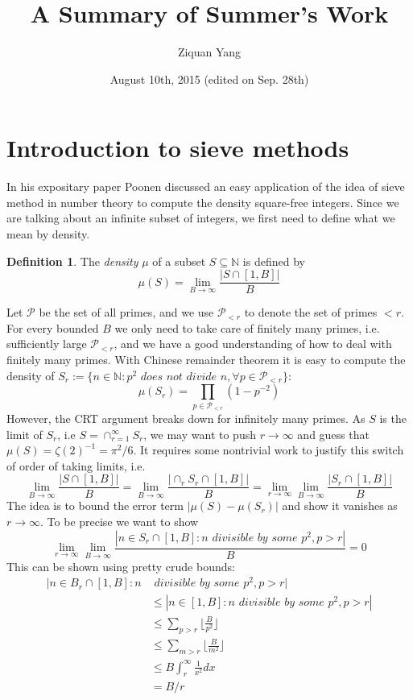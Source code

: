 \documentclass[12pt]{article}
\theoremstyle{plain}
\theoremstyle{definition}
\newtheorem{definition}[equation]{Definition}
\newcommand{\IN}{\mathbb{N}}
\newcommand{\sP}{\mathcal{P}}
\newcommand{\<}{\langle}
\renewcommand{\>}{\rangle}
\begin{document}
%

\title{A Summary of Summer's Work}
\author{Ziquan Yang}


\date{August 10th, 2015 (edited on Sep. 28th)}

\maketitle


 

\setcounter{section}{0}
\section{Introduction to sieve methods}
In his expositary paper \cite{Expo} Poonen discussed an easy application of the idea of sieve method in number theory to compute the density square-free integers. Since we are talking about an infinite subset of integers, we first need to define what we mean by density. 
\begin{definition}
\label{Zdef}
The \textit{density} $\mu$ of a subset $S \subseteq \IN$ is defined by
$$\mu(S) = \lim_{B \to \infty} \frac{|S \cap [1, B]|}{B} $$
\end{definition} Let $\sP$ be the set of all primes, and we use $\sP_{<r}$ to denote the set of primes $<r$. For every bounded $B$ we only need to take care of finitely many primes, i.e. sufficiently large $\sP_{<r}$, and we have a good understanding of how to deal with finitely many primes. With Chinese remainder theorem it is easy to compute the density of $S_r := \{ n \in \IN : p^2 \textit{ does not divide } n, \forall p \in \sP_{<r} \}$: $$\mu(S_r) = \prod_{p \in \sP_{< r}} (1 - p^{-2})$$
However, the CRT argument breaks down for infinitely many primes. As $S$ is the limit of $S_r$, i.e $S = \cap_{r = 1}^\infty S_r$, we may want to push $r \to \infty$ and guess that $\mu(S) = \zeta(2)^{-1} = \pi^2/6$. It requires some nontrivial work to justify this switch of order of taking limits, i.e. 
$$ \lim_{B \to \infty} \frac{|S \cap [1, B]|}{B} = \lim_{B \to \infty} \frac{|\cap_r S_r \cap [1, B]|}{B} = \lim_{r \to \infty} \lim_{B \to \infty} \frac{|S_r \cap [1, B]|}{B}$$
The idea is to bound the error term $|\mu(S) - \mu(S_r)|$ and show it vanishes as $r \to \infty$. To be precise we want to show $$\lim_{r \to \infty} \lim_{B \to \infty} \frac{|n \in S_r \cap [1, B]: n \textit{ divisible by some }p^2, p >r|}{B} = 0$$
This can be shown using pretty crude bounds:
\begin{align*} |n \in B_r \cap [1, B]: n & \textit{ divisible by some }p^2, p >r| \\ &\le |n \in [1, B]: n \textit{ divisible by some }p^2, p >r| \\ &\le \sum_{p > r} \lfloor \frac{B}{p^2} \rfloor \\
&\le \sum_{m > r} \lfloor \frac{B}{m^2} \rfloor \\
&\le B \int_r^\infty \frac{1}{x^2} dx \\
&= B/r
\end{align*}
\end{document}
